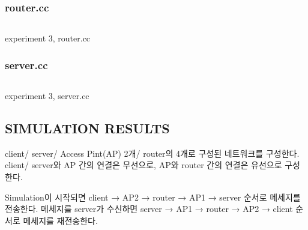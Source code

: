         \subsubsection{router.cc}
            \vspace{-2mm}
            \begin{listing}[h!]
            \inputminted[framerule = 1pt,framesep = 2mm , frame = lines, fontsize=\footnotesize]{c}{./code/week10/Experiment03/04_router.cpp}
            \vspace{-3mm}
            \caption{\footnotesize experiment 3, router.cc}
            \end{listing}
            \vspace{-6mm}    
        \subsubsection{server.cc}
            \vspace{-2mm}
            \begin{listing}[h!]
            \inputminted[framerule = 1pt,framesep = 2mm , frame = lines, fontsize=\footnotesize]{c}{./code/week10/Experiment03/05_server.cpp}
            \vspace{-3mm}
            \caption{\footnotesize experiment 3, server.cc}
            \end{listing}
            \vspace{-6mm}    

    \subsection{SIMULATION RESULTS}
    \vspace{-1mm}
    client/ server/ Access Pint(AP) 2개/ router의 4개로 구성된 네트워크를 구성한다. 
    client/ server와 AP 간의 연결은 무선으로, AP와 router 간의 연결은 유선으로 구성한다. 
    
    Simulation이 시작되면 client → AP2 → router → AP1 → server 순서로 메세지를 전송한다.
    메세지를 server가 수신하면 server → AP1 → router → AP2 → client 순서로 메세지를 재전송한다.
    \vspace{-3mm}
